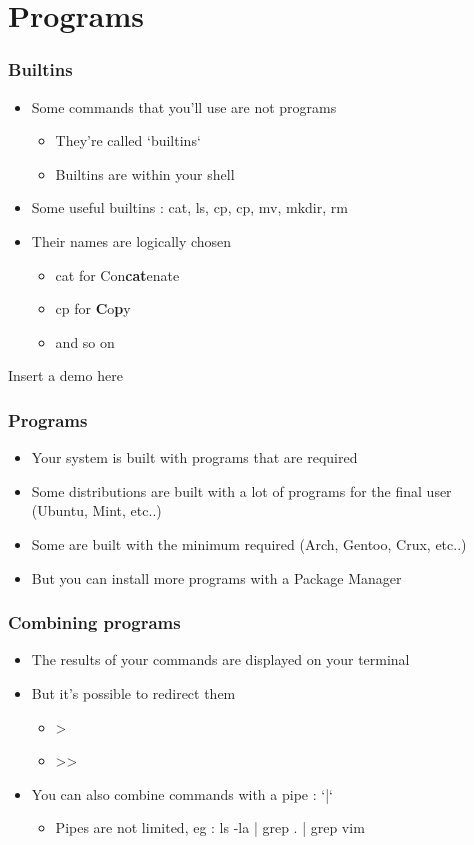 \section{Programs}
\begin{frame}
    \frametitle{Builtins}
    \begin{itemize}
	\item Some commands that you'll use are not programs
	\begin{itemize}
	    \item They're called `builtins`
	    \item Builtins are within your shell
	\end{itemize}
	\item Some useful builtins : cat, ls, cp, cp, mv, mkdir, rm
	\item Their names are logically chosen
	\begin{itemize}
	    \item cat for Con\textbf{cat}enate
	    \item cp for \textbf{C}o\textbf{p}y
	    \item and so on
	\end{itemize}
    \end{itemize}
\end{frame}

\begin{frame}
    Insert a demo here
\end{frame}

\begin{frame}
    \frametitle{Programs}
    \begin{itemize}
	\item Your system is built with programs that are required
	\item Some distributions are built with a lot of programs for the final user (Ubuntu, Mint, etc..)
	\item Some are built with the minimum required (Arch, Gentoo, Crux, etc..)
	\item But you can install more programs with a Package Manager
    \end{itemize}
\end{frame}

\begin{frame}
    \frametitle{Combining programs}
    \begin{itemize}
	\item The results of your commands are displayed on your terminal
	\item But it's possible to redirect them
	\begin{itemize}
	    \item >
	    \item >>
	\end{itemize}
	\item You can also combine commands with a pipe : `|`
	\begin{itemize}
	    \item Pipes are not limited, eg : ls -la | grep . | grep vim
	\end{itemize}
    \end{itemize}
\end{frame}

